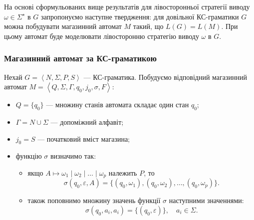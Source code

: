На основі сформульованих вище результатів для лівосторонньої стратегії виводу $\omega \in \Sigma^\star$ в $G$ запропонуємо наступне твердження: для довільної КС-граматики $G$ можна побудувати магазинний автомат $M$ такий, що $L(G) = L(M)$. При цьому автомат буде моделювати лівосторонню стратегію виводу $\omega$ в $G$.

\subsubsection{Магазинний автомат за КС-граматикою}

Нехай $G = \left\langle N, \Sigma, P, S \right\rangle$ --- КС-граматика. Побудуємо відповідний магазинний автомат $M = \left\langle Q, \Sigma, \Gamma, q_0, j_0, \sigma, F \right\rangle$:
\begin{itemize}
	\item $Q = \{q_0\}$ --- множину станів автомата складає один стан $q_0$;
	\item $\Gamma = N \cup \Sigma$ --- допоміжний алфавіт;
	\item $j_0 = S$ --- початковий вміст магазина;
	\item функцію $\sigma$ визначимо так:
	\begin{itemize}
		\item якщо $A \mapsto \omega_1 \mid \omega_2 \mid \ldots \mid \omega_p$ належить $P$, то
		\begin{equation}
			\sigma(q_0, \varepsilon, A)=\{(q_0, \omega_1), (q_0, \omega_2), \ldots, (q_0, \omega_p)\}.
		\end{equation}
		\item також поповнимо множину значень функції $\sigma$ наступними значеннями:
		\begin{equation}
			\sigma(q_0, a_i, a_i) = \{(q_0, \varepsilon)\}, \quad a_i \in \Sigma.
		\end{equation}
	\end{itemize}
\end{itemize}

